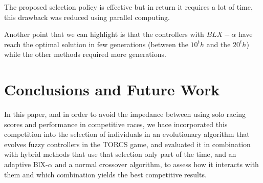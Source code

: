 \documentclass[10pt,journal,compsoc]{IEEEtran}
\begin{document}
The proposed selection policy is effective but in return it requires a
lot of time, this drawback was reduced using parallel computing.

Another point that we can highlight is that the controllers with
$BLX-\alpha$ have reach the optimal solution in few generations
(between the $10^th$ and the $20^th$) while the other methods required more
generations. 


\section{Conclusions and Future Work} 
\label{sec:conclusions}

In this paper, and in order to avoid the impedance between using solo
racing scores and performance in competitive races, we hace
incorporated this competition into the selection of individuals in an
evolutionary algorithm that evolves fuzzy controllers in the TORCS
game, and evaluated it in combination with hybrid methods that use
that selection only part of the time, and an adaptive BlX-$\alpha$ and
a normal crossover algorithm, to assess how it interacts with them and
which combination yields the best competitive results.


\end{document}
